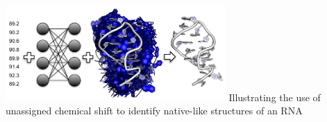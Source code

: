\documentclass[journal=jcisd8,manuscript=article,layout=onecolumn]{achemso}
\begin{document}



\begin{tocentry}
\centering
\includegraphics[width=3.3in]{toc}
Illustrating the use of unassigned chemical shift  to identify native-like structures of an RNA
\end{tocentry}
\end{document}
